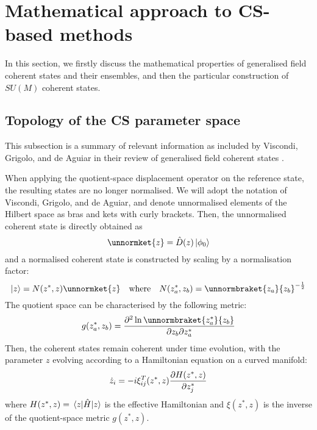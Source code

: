 \section{Mathematical approach to CS-based methods}\label{sec:mathematical_approach}
In this section, we firstly discuss the mathematical properties of generalised field coherent states and their ensembles, and then the particular construction of $SU(M)$ coherent states.
	
\subsection{Topology of the CS parameter space}
This subsection is a summary of relevant information as included by Viscondi, Grigolo, and de Aguiar in their review of generalised field coherent states \cite{aguiar}.

When applying the quotient-space displacement operator on the reference state, the resulting states are no longer normalised. We will adopt the notation of Viscondi, Grigolo, and de Aguiar, and denote unnormalised elements of the Hilbert space as bras and kets with curly brackets. Then, the unnormalised coherent state is directly obtained as
\begin{equation}
\unnormket{z}=\hat{D}(z)\ket{\phi_0}
\end{equation}
and a normalised coherent state is constructed by scaling by a normalisation factor:
\begin{equation}
\ket{z}=N(z^*, z)\unnormket{z}\qq{where}N(z_a^*, z_b)=\unnormbraket{z_a}{z_b}^{-\frac{1}{2}}
\end{equation}
The quotient space can be characterised by the following metric:
\begin{equation}
g(z_a^*, z_b)=\pdv{\ln\unnormbraket{z_a^*}{z_b}}{z_b}{z_a^*}
\end{equation} 
Then, the coherent states remain coherent under time evolution, with the parameter $z$ evolving according to a Hamiltonian equation on a curved manifold:
\begin{equation}
\dot{z}_i=-i\xi^T_{ij}(z^*, z)\pdv{H(z^*, z)}{z_j^*}
\end{equation}
where $H(z^*, z)=\mel{z}{\hat{H}}{z}$ is the effective Hamiltonian and $\xi(z^*, z)$ is the inverse of the quotient-space metric $g(z^*, z)$.

	

